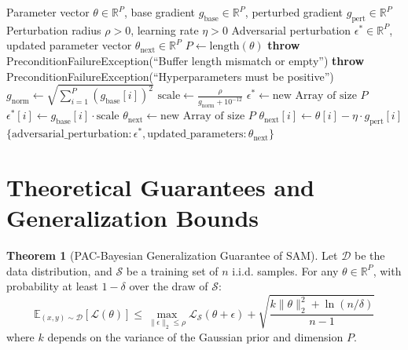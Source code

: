 \documentclass[11pt,a4paper]{article}
\theoremstyle{definition}
\newtheorem{theorem}{Theorem}[section]
\begin{document}
\begin{algorithm}[H]
\caption{Sharpness-Aware Minimization (SAM) Parameter Update}
\begin{algorithmic}[1]
\Require Parameter vector $\theta \in \mathbb{R}^P$, base gradient $g_{\text{base}} \in \mathbb{R}^P$, perturbed gradient $g_{\text{pert}} \in \mathbb{R}^P$
\Require Perturbation radius $\rho > 0$, learning rate $\eta > 0$
\Ensure Adversarial perturbation $\epsilon^* \in \mathbb{R}^P$, updated parameter vector $\theta_{\text{next}} \in \mathbb{R}^P$
\State $P \gets \text{length}(\theta)$
    \State \textbf{throw} PreconditionFailureException(``Buffer length mismatch or empty'')
\EndIf
{}
    \State \textbf{throw} PreconditionFailureException(``Hyperparameters must be positive'')
\EndIf
\State $g_{\text{norm}} \gets \sqrt{\sum_{i=1}^P (g_{\text{base}}[i])^2}$
\State $\text{scale} \gets \frac{\rho}{g_{\text{norm}} + 10^{-12}}$
\State $\epsilon^* \gets \text{new Array of size } P$
    \State $\epsilon^*[i] \gets g_{\text{base}}[i] \cdot \text{scale}$
\EndFor
\State $\theta_{\text{next}} \gets \text{new Array of size } P$
    \State $\theta_{\text{next}}[i] \gets \theta[i] - \eta \cdot g_{\text{pert}}[i]$
\EndFor
\State \Return $\{\text{adversarial\_perturbation}: \epsilon^*, \text{updated\_parameters}: \theta_{\text{next}}\}$
\end{algorithmic}
\end{algorithm}

\section{Theoretical Guarantees and Generalization Bounds}

\begin{theorem}[PAC-Bayesian Generalization Guarantee of SAM]
Let $\mathcal{D}$ be the data distribution, and $\mathcal{S}$ be a training set of $n$ i.i.d. samples. For any $\theta \in \mathbb{R}^P$, with probability at least $1 - \delta$ over the draw of $\mathcal{S}$:
\begin{equation}
\mathbb{E}_{(x, y) \sim \mathcal{D}}[\mathcal{L}(\theta)] \le \max_{\|\epsilon\|_2 \le \rho} \mathcal{L}_{\mathcal{S}}(\theta + \epsilon) + \sqrt{\frac{k \|\theta\|_2^2 + \ln(n / \delta)}{n - 1}}
\end{equation}
where $k$ depends on the variance of the Gaussian prior and dimension $P$.
\end{theorem}
\end{document}
